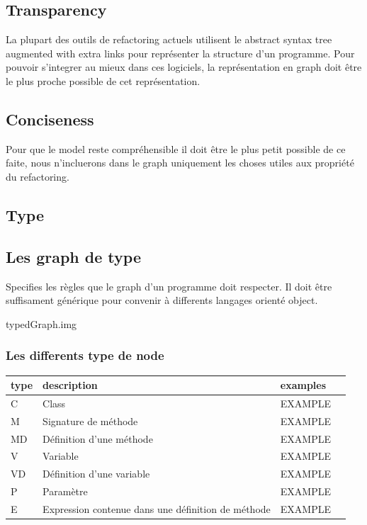\documentclass[a4paper, 10pt]{article}
\begin{document}
\subsection{Transparency}
La plupart des outils de refactoring actuels utilisent le abstract syntax tree augmented with extra links pour représenter la structure d'un programme. Pour pouvoir s'integrer au mieux dans ces logiciels, la représentation en graph doit être le plus proche possible de cet représentation.

\subsection{Conciseness}
Pour que le model reste compréhensible il doit être le plus petit possible de ce faite, nous n'incluerons dans le graph uniquement les choses utiles aux propriété du refactoring.

\subsection{Type}


\subsection{Les graph de type}

Specifies les règles que le graph d'un programme doit respecter. Il doit être suffisament générique pour convenir à differents langages orienté object.


typedGraph.img 

\subsubsection{Les differents type de node}


  \begin{tabular}{ | l | l | l | p{5cm} |}
    \hline
    type & description & examples \\ \hline
    C & Class & EXAMPLE   \\ \hline
    M & Signature de méthode & EXAMPLE   \\ \hline
    MD &  Définition d'une méthode & EXAMPLE   \\ \hline
    V &  Variable & EXAMPLE   \\ \hline
    VD &  Définition d'une variable  & EXAMPLE   \\ \hline
    P & Paramètre & EXAMPLE   \\ \hline
    E &  Expression contenue dans une définition de méthode & EXAMPLE   \\ \hline

    \end{tabular}
\end{document}
